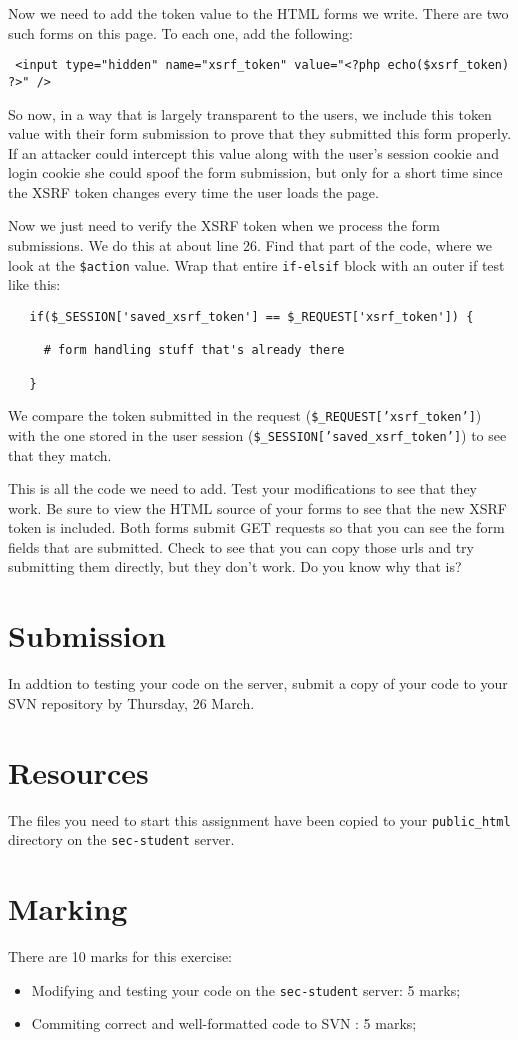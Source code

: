 \documentclass{article}
\begin{document}
Now we need to add the token value to the HTML forms we write.  There are two such forms
on this page.  To each one, add the following:

\begin{verbatim}
 <input type="hidden" name="xsrf_token" value="<?php echo($xsrf_token) ?>" />
\end{verbatim}

So now, in a way that is largely transparent to the users, we include this token value
with their form submission to prove that they submitted this form properly.  If an 
attacker could intercept this value along with the user's session cookie and login cookie
she could spoof the form submission, but only for a short time since the XSRF token changes
every time the user loads the page.

\newpage 

Now we just need to verify the XSRF token when we process the form submissions.  We do this at about 
line 26. Find that part of the code, where we look at the \texttt{\$action} value. Wrap that entire
\texttt{if-elsif} block with an outer if test like this:

\begin{verbatim}
   if($_SESSION['saved_xsrf_token'] == $_REQUEST['xsrf_token']) {

     # form handling stuff that's already there

   }
\end{verbatim}

We compare the token submitted in the request (\texttt{\$\_REQUEST['xsrf\_token']})
with the one stored in the user session  (\texttt{\$\_SESSION['saved\_xsrf\_token']}) to 
see that they match.

This is all the code we need to add.  Test your modifications to see that they work.  Be sure
to view the HTML source of your forms to see that the new XSRF token is included.  Both forms
submit GET requests so that you can see the form fields that are submitted. Check to see that
you can copy those urls and try submitting them directly, but they don't work.  Do you know why 
that is?

\section{Submission}
In addtion to testing your code on the server, submit a copy of your code to your SVN repository by
Thursday, 26 March.

\section{Resources}
The files you need to start this assignment have been copied to your \texttt{public\_html} directory
on the \texttt{sec-student} server.

\section{Marking}

There are 10 marks for this exercise:

\begin{itemize}
	\item Modifying and testing your code on the \texttt{sec-student} server: 5 marks;
	\item Commiting correct and well-formatted code to SVN : 5 marks;
\end{itemize}
\end{document}
